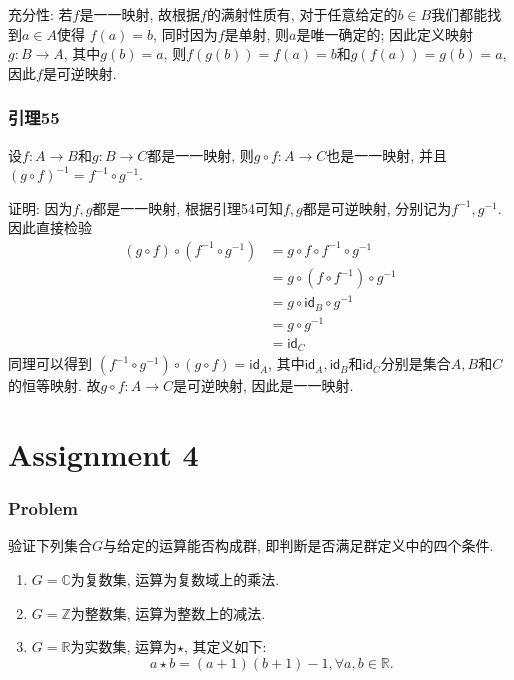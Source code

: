 \documentclass[a4paper,12pt]{ctexart}
\begin{document}
    充分性: 若$f$是一一映射, 故根据$f$的满射性质有, 对于任意给定的$b\in B$我们都能找到$a\in A$使得 $f(a)=b$, 同时因为$f$是单射, 则$a$是唯一确定的; 因此定义映射$g:B\rightarrow A$, 其中$g(b)=a$, 则$f(g(b))=f(a)=b$和$g(f(a))=g(b)=a$, 因此$f$是可逆映射.

\subsubsection*{引理55}
    设$f:A\rightarrow B$和$g:B\rightarrow C$都是一一映射, 则$g\circ f:A\rightarrow C$也是一一映射, 并且$(g\circ f)^{-1} = f^{-1}\circ g^{-1}$.

    证明: 因为$f,g$都是一一映射, 根据引理54可知$f,g$都是可逆映射, 分别记为$f^{-1},g^{-1}$. 因此直接检验
    \begin{align*}
        (g\circ f)\circ(f^{-1}\circ g^{-1}) &=g\circ f\circ f^{-1}\circ g^{-1}\\
                                            &=g\circ (f\circ f^{-1})\circ g^{-1}\\
                                            &=g\circ \mathsf{id}_B\circ g^{-1}\\
                                            &=g\circ g^{-1}\\
                                            &=\mathsf{id}_C 
    \end{align*}
    同理可以得到 $(f^{-1}\circ g^{-1})\circ(g\circ f)=\mathsf{id}_A$, 其中$\mathsf{id}_A,\mathsf{id}_B$和$\mathsf{id}_C$分别是集合$A,B$和$C$的恒等映射.
    故$g\circ f:A\rightarrow C$是可逆映射, 因此是一一映射. 


    \section*{Assignment 4}
\subsubsection*{Problem}
    验证下列集合$G$与给定的运算能否构成群, 即判断是否满足群定义中的四个条件.
    \begin{enumerate}[label=(\arabic{*})]
        \item $G=\mathbb{C}$为复数集, 运算为复数域上的乘法.
        \item $G=\mathbb{Z}$为整数集, 运算为整数上的减法.
        \item $G=\mathbb{R}$为实数集, 运算为$\star$, 其定义如下: \[a\star b=(a+1)(b+1)-1,\forall a,b\in \mathbb{R}.\]
    \end{enumerate}
\end{document}
